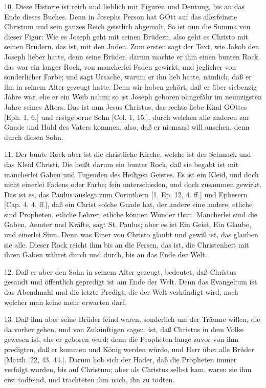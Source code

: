 10. Diese Historie ist reich und lieblich mit Figuren und Deutung, bis an das Ende dieses Buches. Denn in Josephs Person hat GOtt auf das allerfeinste Christum und sein ganzes Reich geistlich abgemalt. So ist nun die Summa von dieser Figur: Wie es Joseph geht mit seinen Brüdern, also geht es Christo mit seinen Brüdern, das ist, mit den Juden. Zum ersten sagt der Text, wie Jakob den Joseph lieber hatte, denn seine Brüder, darum machte er ihm einen bunten Rock, das war ein langer Rock, von mancherlei Faden gewirkt, und jeglicher von sonderlicher Farbe; und sagt Ursache, warum er ihn lieb hatte, nämlich, daß er ihn in seinem Alter gezeugt hatte. Denn wir haben gehört, daß er über siebenzig Jahre war, ehe er ein Weib nahm; so ist Joseph geboren ohngefähr im neunzigsten Jahre seines Alters. Das ist nun Jesus Christus, das rechte liebe Kind GOttes [Eph. 1, 6.] und erstgeborne Sohn [Col. 1, 15.], durch welchen alle anderen zur Gnade und Huld des Vaters kommen, also, daß er niemand will ansehen, denn durch diesen Sohn.

11. Der bunte Rock aber ist die christliche Kirche, welche ist der Schmuck und das Kleid Christi. Die heißt darum ein bunter Rock, daß sie begabt ist mit mancherlei Gaben und Tugenden des Heiligen Geistes. Es ist ein Kleid, und doch nicht einerlei Fadens oder Farbe; fein unterschieden, und doch zusammen gewirkt. Das ist es, das Paulus auslegt zum Corinthern [1. Ep. 12, 4. ff.] und Ephesern [Cap. 4, 4. ff.], daß ein Christ solche Gnade hat, der andere eine andere; etliche sind Propheten, etliche Lehrer, etliche können Wunder thun. Mancherlei sind die Gaben, Aemter und Kräfte, sagt St. Paulus; aber es ist Ein Geist, Ein Glaube, und einerlei Sinn. Denn was Einer von Christo glaubt und gewiß ist, das glauben sie alle. Dieser Rock reicht ihm bis an die Fersen, das ist, die Christenheit mit ihren Gaben währet durch und durch, bis an das Ende der Welt.

12. Daß er aber den Sohn in seinem Alter gezeugt, bedeutet, daß Christus gesandt und öffentlich gepredigt ist am Ende der Welt. Denn das Evangelium ist das Abendmahl und die letzte Predigt, die der Welt verkündigt wird, nach welcher man keine mehr erwarten darf.

13. Daß ihm aber seine Brüder feind waren, sonderlich um der Träume willen, die da vorher
gehen, und von Zukünftigen sagen, ist, daß Christus in dem Volke gewesen ist, ehe er geboren ward; denn die Propheten lange zuvor von ihm predigten, daß er kommen und König werden würde, und Herr über alle Brüder [Matth. 22, 43. 44.]. Darum hob sich der Hader, daß die Propheten immer verfolgt wurden, bis auf Christum; aber als Christus selbst kam, waren sie ihm erst todfeind, und trachteten ihm nach, ihn zu tödten.

